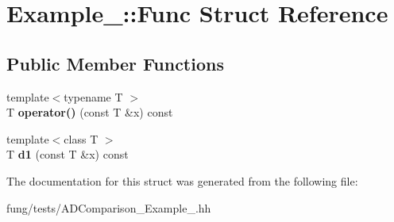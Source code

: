\hypertarget{structExample__2_1_1Func}{\section{Example\-\_\-:\-:Func Struct Reference}
\label{structExample__2_1_1Func}
}
\subsection*{Public Member Functions}
\begin{DoxyCompactItemize}
\item 
\hypertarget{structExample__2_1_1Func_a27f4e04c1ea9bfd01df2131aaf594a41}{{\footnotesize template$<$typename T $>$ }\\T {\bfseries operator()} (const T \&x) const }\label{structExample__2_1_1Func_a27f4e04c1ea9bfd01df2131aaf594a41}

\item 
\hypertarget{structExample__2_1_1Func_ab0d346499fe17a6c16c486f98e3beebc}{{\footnotesize template$<$class T $>$ }\\T {\bfseries d1} (const T \&x) const }\label{structExample__2_1_1Func_ab0d346499fe17a6c16c486f98e3beebc}

\end{DoxyCompactItemize}


The documentation for this struct was generated from the following file\-:\begin{DoxyCompactItemize}
\item 
fung/tests/A\-D\-Comparison\-\_\-\-Example\-\_.\-hh\end{DoxyCompactItemize}
